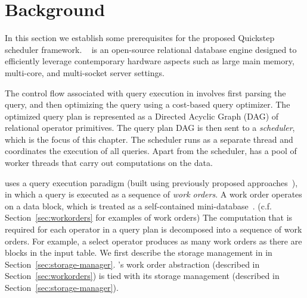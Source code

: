 \section{Background}\label{sec:background}
In this section we establish some prerequisites for the proposed Quickstep scheduler framework.
\sys{}~\cite{quickstep-system} is an open-source relational database engine 
designed to efficiently leverage contemporary hardware aspects such as large main memory, multi-core, and multi-socket server settings. 

The control flow associated with query execution in \sys{} involves first parsing the query, and then optimizing the query using a cost-based query optimizer.
The optimized query plan is represented as a Directed Acyclic Graph (DAG) of relational operator primitives. 
The query plan DAG is then sent to a \textit{scheduler}, which is the focus of this chapter. 
The scheduler runs as a separate thread and coordinates the execution of all queries. 
Apart from the scheduler, \sys{} has a pool of worker threads that carry out computations on the data. 

\sys{} uses a query execution paradigm (built using previously proposed approaches~\cite{quickstep-storage,morsel}), in which a query is executed as a sequence of \textit{work orders}. 
A work order operates on a data block, which is treated as a self-contained mini-database~\cite{quickstep-storage}.  (c.f. Section~\ref{sec:workorders} for examples of work orders)
The computation that is required for each operator in a query plan is decomposed into a sequence of work orders. 
For example, a select operator produces as many work orders as there are blocks in the input table. 
We first describe the storage management in \sys{} in Section~\ref{sec:storage-manager}.
\sys{}'s work order abstraction (described in Section~\ref{sec:workorders}) is tied with its storage management (described in Section~\ref{sec:storage-manager}).

